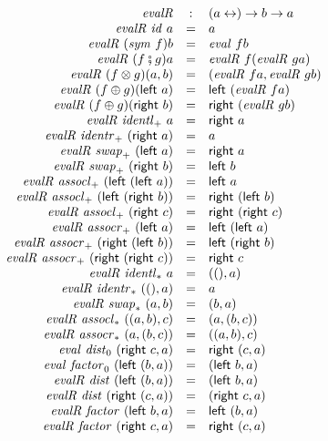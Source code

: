 \documentclass[11pt]{article}
\newcommand{\leftv}[1]{\textsf{left}~#1}
\newcommand{\rightv}[1]{\textsf{right}~#1}
\newcommand{\iso}{\leftrightarrow}
\newcommand{\identlp}{\mathit{identl}_+}
\newcommand{\identrp}{\mathit{identr}_+}
\newcommand{\swapp}{\mathit{swap}_+}
\newcommand{\assoclp}{\mathit{assocl}_+}
\newcommand{\assocrp}{\mathit{assocr}_+}
\newcommand{\identlt}{\mathit{identl}_*}
\newcommand{\identrt}{\mathit{identr}_*}
\newcommand{\swapt}{\mathit{swap}_*}
\newcommand{\assoclt}{\mathit{assocl}_*}
\newcommand{\assocrt}{\mathit{assocr}_*}
\newcommand{\distz}{\mathit{dist}_0}
\newcommand{\factorz}{\mathit{factor}_0}
\newcommand{\dist}{\mathit{dist}}
\newcommand{\factor}{\mathit{factor}}
\newcommand{\idc}{\mathit{id}}
\newcommand{\symc}[1]{\mathit{sym}~#1}
\begin{document}
\[\begin{array}{rcl}
\mathit{evalR} &:& (a \iso ) \rightarrow b \rightarrow a \\
\mathit{evalR}~\idc~a &=& a \\
\mathit{evalR}~(\symc{f}) b &=& \mathit{eval}~f b \\
\mathit{evalR}~(f \fatsemi g) a &=& \mathit{evalR}~f (\mathit{evalR}~g a) \\
\mathit{evalR}~(f \otimes g) (a,b) &=& 
  (\mathit{evalR}~f a, \mathit{evalR}~g b) \\
\mathit{evalR}~(f \oplus g) (\leftv{a}) &=& \leftv{(\mathit{evalR}~f a)} \\
\mathit{evalR}~(f \oplus g) (\rightv{b}) &=& \rightv{(\mathit{evalR}~g b)} \\
\mathit{evalR}~\identlp~a &=& \rightv{a} \\
\mathit{evalR}~\identrp~(\rightv{a}) &=& a \\
\mathit{evalR}~\swapp~(\leftv{a}) &=& \rightv{a} \\
\mathit{evalR}~\swapp~(\rightv{b}) &=& \leftv{b} \\ 
\mathit{evalR}~\assoclp~(\leftv{(\leftv{a})}) &=& \leftv{a} \\
\mathit{evalR}~\assoclp~(\leftv{(\rightv{b})}) &=& \rightv{(\leftv{b})} \\
\mathit{evalR}~\assoclp~(\rightv{c}) &=& \rightv{(\rightv{c})} \\
\mathit{evalR}~\assocrp~(\leftv{a}) &=& \leftv{(\leftv{a})} \\
\mathit{evalR}~\assocrp~(\rightv{(\leftv{b})}) &=& \leftv{(\rightv{b})} \\
\mathit{evalR}~\assocrp~(\rightv{(\rightv{c})}) &=& \rightv{c} \\
\mathit{evalR}~\identlt~a &=& ((), a) \\
\mathit{evalR}~\identrt~((), a) &=& a \\
\mathit{evalR}~\swapt~(a,b) &=& (b,a) \\
\mathit{evalR}~\assoclt~((a,b),c)  &=& (a,(b,c)) \\
\mathit{evalR}~\assocrt~(a,(b,c)) &=& ((a,b),c) \\
\mathit{eval}~\distz~(\rightv{c}, a) &=& \rightv{(c, a)} \\
\mathit{eval}~\factorz~(\leftv{(b, a)}) &=& (\leftv{b}, a) \\
\mathit{evalR}~\dist~(\leftv{(b, a)}) &=& (\leftv{b}, a) \\
\mathit{evalR}~\dist~(\rightv{(c, a)}) &=& (\rightv{c}, a) \\
\mathit{evalR}~\factor~(\leftv{b}, a) &=& \leftv{(b, a)} \\
\mathit{evalR}~\factor~(\rightv{c}, a) &=& \rightv{(c, a)}
\end{array}\]
\end{document}
